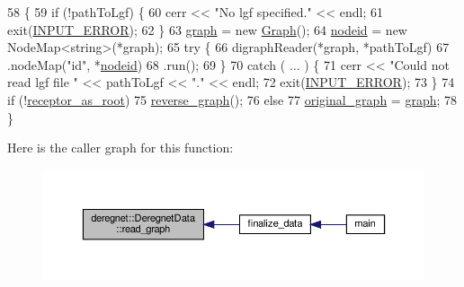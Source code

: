 \begin{DoxyCode}
58                                                \{
59     \textcolor{keywordflow}{if} (!pathToLgf) \{
60         cerr << \textcolor{stringliteral}{"No lgf specified."} << endl;
61         exit(\hyperlink{DeregnetData_8hpp_a288116f92845fddefeb044f5b84bc889}{INPUT\_ERROR});
62     \}
63     \hyperlink{classderegnet_1_1DeregnetData_ab76d30fa2ef87099faecb31e3f95b6d6}{graph} = \textcolor{keyword}{new} \hyperlink{namespacederegnet_a55b76c55bbabc682cbc61f8b9948799e}{Graph}();
64     \hyperlink{classderegnet_1_1DeregnetData_a3b57d7ed19c104c7fe257e17f0d2cfb5}{nodeid} = \textcolor{keyword}{new} NodeMap<string>(*graph);
65     \textcolor{keywordflow}{try} \{
66         digraphReader(*graph, *pathToLgf)
67         .nodeMap(\textcolor{stringliteral}{"id"}, *\hyperlink{classderegnet_1_1DeregnetData_a3b57d7ed19c104c7fe257e17f0d2cfb5}{nodeid})
68         .run();
69     \}
70     \textcolor{keywordflow}{catch} ( ... ) \{
71         cerr << \textcolor{stringliteral}{"Could not read lgf file "} << pathToLgf << \textcolor{stringliteral}{"."} << endl;
72         exit(\hyperlink{DeregnetData_8hpp_a288116f92845fddefeb044f5b84bc889}{INPUT\_ERROR});
73     \}
74     \textcolor{keywordflow}{if} (!\hyperlink{classderegnet_1_1DeregnetData_ae7936fe59661a68464134b9251303727}{receptor\_as\_root})
75         \hyperlink{classderegnet_1_1DeregnetData_aa36e9ddbc2d055ac7661e74f8fa76da4}{reverse\_graph}();
76     \textcolor{keywordflow}{else}
77         \hyperlink{classderegnet_1_1DeregnetData_a3ea2abe9900785d80fa0141afdd985a9}{original\_graph} = \hyperlink{classderegnet_1_1DeregnetData_ab76d30fa2ef87099faecb31e3f95b6d6}{graph};
78 \}
\end{DoxyCode}
Here is the caller graph for this function\+:\nopagebreak
\begin{figure}[H]
\begin{center}
\leavevmode
\includegraphics[width=350pt]{classderegnet_1_1DeregnetData_ae5edd8f077b20056f416d42ef3fb03d2_icgraph}
\end{center}
\end{figure}
\mbox{\label{classderegnet_1_1DeregnetData_a01308048556370738e4ac335aba62ffd}} 
